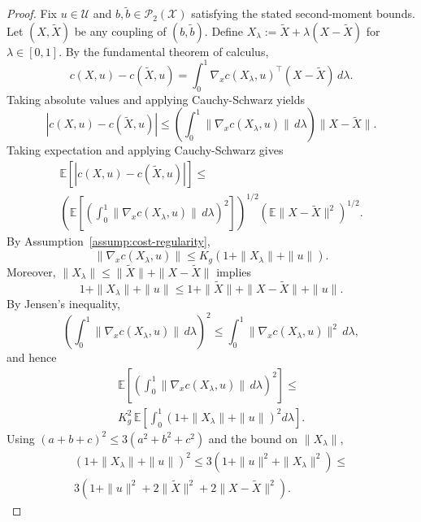 \documentclass[10pt,a4paper]{amsart}
\begin{document}
\begin{proof}
Fix $u\in\mathcal{U}$ and $b,\tilde b\in\mathcal{P}_2(\mathcal{X})$ satisfying the stated second-moment bounds.
Let $(X,\tilde X)$ be any coupling of $(b,\tilde b)$.
Define $X_\lambda:=\tilde X+\lambda(X-\tilde X)$ for $\lambda\in[0,1]$.
By the fundamental theorem of calculus,
\begin{equation}
c(X,u)-c(\tilde X,u)
=
\int_0^1 \nabla_x c(X_\lambda,u)^\top (X-\tilde X)\,d\lambda.
\end{equation}
Taking absolute values and applying Cauchy-Schwarz yields
\begin{equation}
|c(X,u)-c(\tilde X,u)|
\le
\left(\int_0^1 \|\nabla_x c(X_\lambda,u)\|\,d\lambda\right)\|X-\tilde X\|.
\end{equation}
Taking expectation and applying Cauchy-Schwarz gives
\begin{multline}
\mathbb{E}\!\left[|c(X,u)-c(\tilde X,u)|\right]
\le \\
\left(
\mathbb{E}\!\left[\left(\int_0^1 \|\nabla_x c(X_\lambda,u)\|\,d\lambda\right)^2\right]
\right)^{\!1/2}
\left(\mathbb{E}\|X-\tilde X\|^2\right)^{\!1/2}.
\end{multline}
By Assumption~\ref{assump:cost-regularity},
\begin{equation}
\|\nabla_x c(X_\lambda,u)\|
\le
K_g\left(1+\|X_\lambda\|+\|u\|\right).
\end{equation}
Moreover, $\|X_\lambda\|\le \|\tilde X\|+\|X-\tilde X\|$ implies
\begin{equation}
1+\|X_\lambda\|+\|u\|
\le
1+\|\tilde X\|+\|X-\tilde X\|+\|u\|.
\end{equation}
By Jensen's inequality,
\begin{equation}
\left(\int_0^1 \|\nabla_x c(X_\lambda,u)\|\,d\lambda\right)^2
\le
\int_0^1 \|\nabla_x c(X_\lambda,u)\|^2\,d\lambda,
\end{equation}
and hence
\begin{multline}
\mathbb{E}\!\left[\left(\int_0^1 \|\nabla_x c(X_\lambda,u)\|\,d\lambda\right)^2\right]
\le \\
K_g^2\,
\mathbb{E}\!\left[
\int_0^1 \left(1+\|X_\lambda\|+\|u\|\right)^2 d\lambda
\right].
\end{multline}
Using $(a+b+c)^2\le 3(a^2+b^2+c^2)$ and the bound on $\|X_\lambda\|$,
\begin{multline}
\left(1+\|X_\lambda\|+\|u\|\right)^2
\le
3\left(1+\|u\|^2+\|X_\lambda\|^2\right)
\le \\
3\left(1+\|u\|^2+2\|\tilde X\|^2+2\|X-\tilde X\|^2\right).

\end{multline}
\end{proof}
\end{document}
